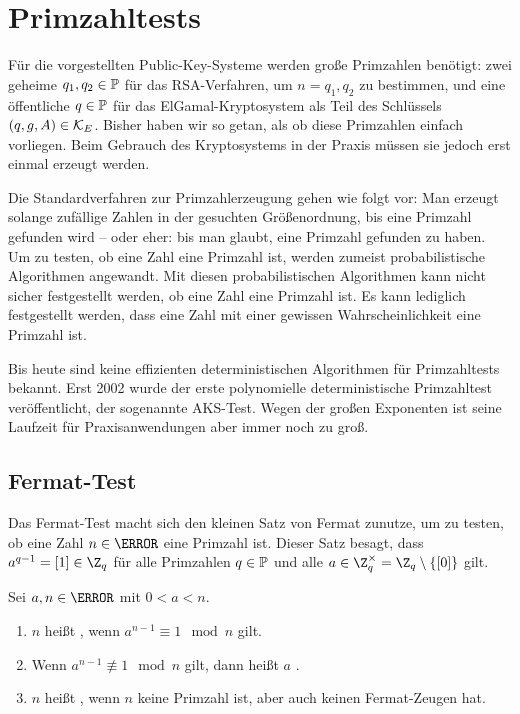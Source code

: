 \section{Primzahltests}

Für die vorgestellten Public-Key-Systeme werden große Primzahlen benötigt: zwei geheime $q_1, q_2 \in \mathbb P$ für das RSA-Verfahren, um $n = q_1, q_2$ zu bestimmen, und eine öffentliche $q \in \mathbb P$ für das ElGamal-Kryptosystem als Teil des Schlüssels $(q, g, A) \in \mathcal K_E$. Bisher haben wir so getan, als ob diese Primzahlen einfach vorliegen. Beim Gebrauch des Kryptosystems in der Praxis müssen sie jedoch erst einmal erzeugt werden. 

Die Standardverfahren zur Primzahlerzeugung gehen wie folgt vor: Man erzeugt solange zufällige Zahlen in der gesuchten Größenordnung, bis eine Primzahl gefunden wird -- oder eher: bis man glaubt, eine Primzahl gefunden zu haben. Um zu testen, ob eine Zahl eine Primzahl ist, werden zumeist probabilistische Algorithmen angewandt. Mit diesen probabilistischen Algorithmen kann nicht sicher festgestellt werden, ob eine Zahl eine Primzahl ist. Es kann lediglich festgestellt werden, dass eine Zahl mit einer gewissen Wahrscheinlichkeit eine Primzahl ist.

Bis heute sind keine effizienten deterministischen Algorithmen für Primzahltests bekannt. Erst 2002 wurde der erste polynomielle deterministische Primzahltest veröffentlicht, der sogenannte AKS-Test. Wegen der großen Exponenten ist seine Laufzeit für Praxisanwendungen aber immer noch zu groß. 

\subsection{Fermat-Test}

Das Fermat-Test macht sich den kleinen Satz von Fermat zunutze, um zu testen, ob eine Zahl $n \in \N$ eine Primzahl ist. Dieser Satz besagt, dass $a^{q-1} = [1] \in \Z_q$ für alle Primzahlen $q \in \mathbb P$ und alle $a \in  \Z_q^{\times} = \Z_{q} \setminus \{[0]\}$ gilt. 

\begin{definition}
 Sei $a, n \in \N$ mit $0 < a < n$. 
 \begin{enumerate}
  \item $n$ heißt , wenn $a^{n-1} \equiv 1 \mod n$ gilt.
  \item Wenn $a^{n-1} \not\equiv 1 \mod n$ gilt, dann heißt $a$ .
  \item $n$ heißt , wenn $n$ keine Primzahl ist, aber auch keinen Fermat-Zeugen hat. 
 \end{enumerate}
\end{definition}

